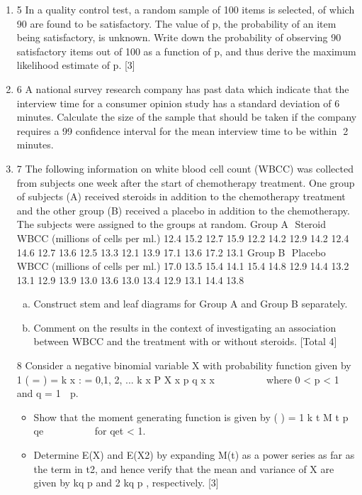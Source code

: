 \documentclass[a4paper,12pt]{article}
\begin{document}
\begin{enumerate}
\item 5 In a quality control test, a random sample of 100 items is selected, of which 90 are
found to be satisfactory. The value of p, the probability of an item being satisfactory,
is unknown.
Write down the probability of observing 90 satisfactory items out of 100 as a function
of p, and thus derive the maximum likelihood estimate of p. [3]
\item 6 A national survey research company has past data which indicate that the interview
time for a consumer opinion study has a standard deviation of 6 minutes.
Calculate the size of the sample that should be taken if the company requires a 99%
confidence interval for the mean interview time to be within 2 minutes. 
\item 7 The following information on white blood cell count (WBCC) was collected from
subjects one week after the start of chemotherapy treatment. One group of subjects
(A) received steroids in addition to the chemotherapy treatment and the other group
(B) received a placebo in addition to the chemotherapy. The subjects were assigned
to the groups at random.
Group A  Steroid
WBCC (millions of cells per ml.)
12.4 15.2 12.7 15.9 12.2 14.2 12.9 14.2 12.4 14.6
12.7 13.6 12.5 13.3 12.1 13.9 17.1 13.6 17.2 13.1
Group B  Placebo
WBCC (millions of cells per ml.)
17.0 13.5 15.4 14.1 15.4 14.8 12.9 14.4 13.2 13.1
12.9 13.9 13.0 13.6 13.0 13.4 12.9 13.1 14.4 13.8
\begin{enumerate}[(a)]
\item Construct stem and leaf diagrams for Group A and Group B separately. 
\item Comment on the results in the context of investigating an association between
WBCC and the treatment with or without steroids. 
[Total 4]
\end{enumerate}

8 Consider a negative binomial variable X with probability function given by
1
( = ) = k x : = 0,1, 2, ... k x
P X x p q x
x
   
 
 
where 0 < p < 1 and q = 1  p.
\begin{itemize}
\item Show that the moment generating function is given by
( ) =
1
k
t
M t p
qe
 
    
for qet < 1. 
\item Determine E(X) and E(X2) by expanding M(t) as a power series as far as the
term in t2, and hence verify that the mean and variance of X are given by
kq
p
and 2
kq
p
, respectively. [3]



\end{itemize}
\end{enumerate}
\end{document}
